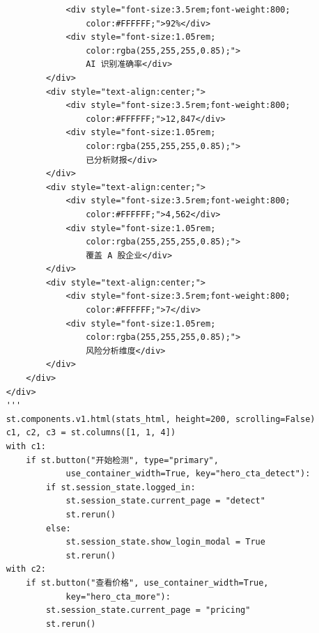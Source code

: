 \documentclass[a4paper,10pt]{article}
\begin{document}
\begin{lstlisting}
                <div style="font-size:3.5rem;font-weight:800;
                    color:#FFFFFF;">92%</div>
                <div style="font-size:1.05rem;
                    color:rgba(255,255,255,0.85);">
                    AI 识别准确率</div>
            </div>
            <div style="text-align:center;">
                <div style="font-size:3.5rem;font-weight:800;
                    color:#FFFFFF;">12,847</div>
                <div style="font-size:1.05rem;
                    color:rgba(255,255,255,0.85);">
                    已分析财报</div>
            </div>
            <div style="text-align:center;">
                <div style="font-size:3.5rem;font-weight:800;
                    color:#FFFFFF;">4,562</div>
                <div style="font-size:1.05rem;
                    color:rgba(255,255,255,0.85);">
                    覆盖 A 股企业</div>
            </div>
            <div style="text-align:center;">
                <div style="font-size:3.5rem;font-weight:800;
                    color:#FFFFFF;">7</div>
                <div style="font-size:1.05rem;
                    color:rgba(255,255,255,0.85);">
                    风险分析维度</div>
            </div>
        </div>
    </div>
    '''
    st.components.v1.html(stats_html, height=200, scrolling=False)
    c1, c2, c3 = st.columns([1, 1, 4])
    with c1:
        if st.button("开始检测", type="primary",
                use_container_width=True, key="hero_cta_detect"):
            if st.session_state.logged_in:
                st.session_state.current_page = "detect"
                st.rerun()
            else:
                st.session_state.show_login_modal = True
                st.rerun()
    with c2:
        if st.button("查看价格", use_container_width=True,
                key="hero_cta_more"):
            st.session_state.current_page = "pricing"
            st.rerun()
\end{lstlisting}
\end{document}
